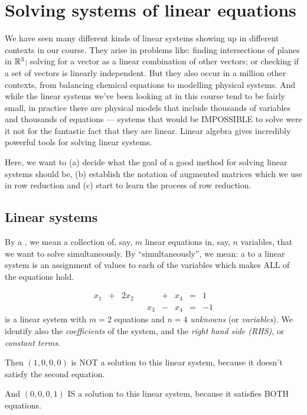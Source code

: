 \chapter{Solving systems of linear equations}

\label{chapter:11solvingsystems}

We have seen many different kinds of linear systems showing up
in different contexts in our course.  They arise in problems like:  
finding 
intersections of planes in $\mathbb{R}^3$;
solving for a vector as a linear combination of other vectors; or
checking if a set of vectors is linearly independent.  But
they also occur in a million other contexts, from balancing
chemical equations to modelling physical systems.  And while
the linear systems we've been looking at in this course tend
to be fairly small, in practice there are physical models that
include thousands of variables and thousands of equations --- 
systems that would be IMPOSSIBLE to solve were it not for the
fantastic fact that they are linear.  Linear algebra gives
incredibly powerful tools for solving linear systems.

Here, we want to (a) decide what the goal of a good method for
solving linear systems should be, (b) establish the notation
of augmented matrices which we use in row reduction and (c)
start to learn the process of row reduction.

\section{Linear systems}

By a , we mean a collection of, say, $m$ linear equations in,
say, 
$n$ variables, that we want to solve simultaneously.  By ``simultaneously'', we
mean: a
 to a linear system is an assignment of values to
each of the variables which makes ALL of the equations hold.

\begin{myexample}
\begin{equation} \label{E11:1}
\begin{matrix}
x_1 & + & 2x_2 &&     & + & x_4 & = & 1\\
    &   &      && x_3 & - & x_4 & = & -1
\end{matrix} 
\end{equation}
is a linear system with $m=2$ equations and $n=4$ \emph{unknowns} (or \emph{variables}).  We identify also the \emph{coefficients} of the system, and the
\emph{right hand side (RHS)}, or \emph{constant terms}.

Then $(1,0,0,0)$ is NOT a solution to this linear system, because it
doesn't satisfy the second equation.

And $(0,0,0,1)$ IS a solution to this linear system, because it
satisfies BOTH equations.
\end{myexample}


